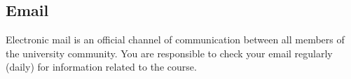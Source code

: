 \subsection{Email}

Electronic mail is an official channel of communication
between all members of the university community.
You are responsible to check your email regularly
(daily)
for information related to the course.

